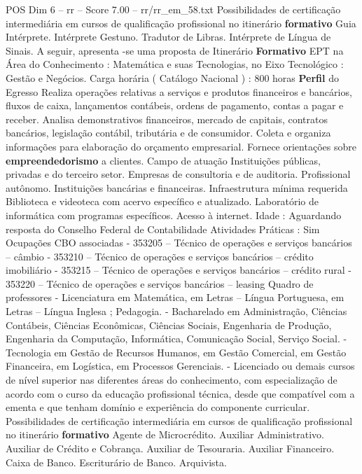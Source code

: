\begin{textsample}{POS Dim 6 – rr – Score 7.00 – rr/rr\_em\_58.txt}
Possibilidades de certificação intermediária em cursos de qualificação profissional no itinerário \textbf{formativo} Guia Intérprete.
Intérprete Gestuno.
Tradutor de Libras.
Intérprete de Língua de Sinais.
A seguir, apresenta -se uma proposta de Itinerário \textbf{Formativo} EPT na Área do Conhecimento : Matemática e suas Tecnologias, no Eixo Tecnológico : Gestão e Negócios.
Carga horária ( Catálogo Nacional ) : 800 horas \textbf{Perfil} do Egresso Realiza operações relativas a serviços e produtos financeiros e bancários, fluxos de caixa, lançamentos contábeis, ordens de pagamento, contas a pagar e receber.
Analisa demonstrativos financeiros, mercado de capitais, contratos bancários, legislação contábil, tributária e de consumidor.
Coleta e organiza informações para elaboração do orçamento empresarial.
Fornece orientações sobre \textbf{empreendedorismo} a clientes.
Campo de atuação Instituições públicas, privadas e do terceiro setor.
Empresas de consultoria e de auditoria.
Profissional autônomo.
Instituições bancárias e financeiras.
Infraestrutura mínima requerida Biblioteca e videoteca com acervo específico e atualizado.
Laboratório de informática com programas específicos.
Acesso à internet.
Idade : Aguardando resposta do Conselho Federal de Contabilidade Atividades Práticas : Sim Ocupações CBO associadas - 353205 – Técnico de operações e serviços bancários – câmbio - 353210 – Técnico de operações e serviços bancários – crédito imobiliário - 353215 – Técnico de operações e serviços bancários – crédito rural - 353220 – Técnico de operações e serviços bancários – leasing Quadro de professores - Licenciatura em Matemática, em Letras – Língua Portuguesa, em Letras – Língua Inglesa ; Pedagogia. - Bacharelado em Administração, Ciências Contábeis, Ciências Econômicas, Ciências Sociais, Engenharia de Produção, Engenharia da Computação, Informática, Comunicação Social, Serviço Social. - Tecnologia em Gestão de Recursos Humanos, em Gestão Comercial, em Gestão Financeira, em Logística, em Processos Gerenciais. - Licenciado ou demais cursos de nível superior nas diferentes áreas do conhecimento, com especialização de acordo com o curso da educação profissional técnica, desde que compatível com a ementa e que tenham domínio e experiência do componente curricular.
Possibilidades de certificação intermediária em cursos de qualificação profissional no itinerário \textbf{formativo} Agente de Microcrédito.
Auxiliar Administrativo.
Auxiliar de Crédito e Cobrança.
Auxiliar de Tesouraria.
Auxiliar Financeiro.
Caixa de Banco.
Escriturário de Banco.
Arquivista.

\end{textsample}

